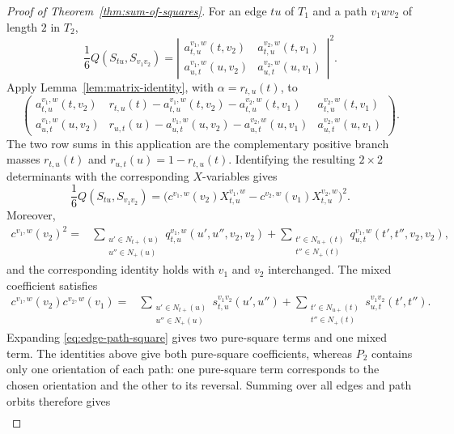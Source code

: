\documentclass[pdflatex,sn-mathphys-num]{sn-jnl}
\theoremstyle{thmstyleone}
\begin{document}
\begin{proof}[Proof of Theorem~\ref{thm:sum-of-squares}]
For an edge $tu$ of $T_1$ and a path $v_1wv_2$ of length $2$ in $T_2$,
\[
\frac16Q(S_{tu},S_{v_1v_2})=
\left|
\begin{matrix}
a_{t,u}^{v_1,w}(t,v_2)&a_{t,u}^{v_2,w}(t,v_1)\\
a_{u,t}^{v_1,w}(u,v_2)&a_{u,t}^{v_2,w}(u,v_1)
\end{matrix}
\right|^2.
\]
Apply Lemma~\ref{lem:matrix-identity}, with $\alpha=r_{t,u}(t)$, to
\begingroup
\small
\setlength{\arraycolsep}{12pt}
\renewcommand{\arraystretch}{1.12}
\[
\begin{pmatrix}
a_{t,u}^{v_1,w}(t,v_2)&
r_{t,u}(t)-a_{t,u}^{v_1,w}(t,v_2)-a_{t,u}^{v_2,w}(t,v_1)&
a_{t,u}^{v_2,w}(t,v_1)\\
a_{u,t}^{v_1,w}(u,v_2)&
r_{u,t}(u)-a_{u,t}^{v_1,w}(u,v_2)-a_{u,t}^{v_2,w}(u,v_1)&
a_{u,t}^{v_2,w}(u,v_1)
\end{pmatrix}.
\]
\endgroup
The two row sums in this application are the complementary positive branch
masses $r_{t,u}(t)$ and $r_{u,t}(u)=1-r_{t,u}(t)$.  Identifying the resulting
$2\times2$ determinants with the corresponding $X$-variables gives
\begin{equation}
\frac16Q(S_{tu},S_{v_1v_2})
=\bigl(c^{v_1,w}(v_2)X_{t,u}^{v_1,w}
-c^{v_2,w}(v_1)X_{t,u}^{v_2,w}\bigr)^2.          \label{eq:edge-path-square}
\end{equation}
Moreover,
\begin{align*}
c^{v_1,w}(v_2)^2
={}&\sum_{\substack{u'\in N_{t+}(u)\\u''\in N_+(u)}}
q_{t,u}^{v_1,w}(u',u'',v_2,v_2)
+\sum_{\substack{t'\in N_{u+}(t)\\t''\in N_+(t)}}
q_{u,t}^{v_1,w}(t',t'',v_2,v_2),
\end{align*}
and the corresponding identity holds with $v_1$ and $v_2$ interchanged.
The mixed coefficient satisfies
\begin{align*}
c^{v_1,w}(v_2)c^{v_2,w}(v_1)
={}&\sum_{\substack{u'\in N_{t+}(u)\\u''\in N_+(u)}}
s_{t,u}^{v_1v_2}(u',u'')
+\sum_{\substack{t'\in N_{u+}(t)\\t''\in N_+(t)}}
s_{u,t}^{v_1v_2}(t',t'').
\end{align*}
Expanding \eqref{eq:edge-path-square} gives two pure-square terms and one mixed
term.  The identities above give both pure-square coefficients, whereas $P_2$
contains only one orientation of each path: one pure-square term corresponds
to the chosen orientation and the other to its reversal.  Summing over all
edges and path orbits therefore gives
\begin{align}

\end{align}
\end{proof}
\end{document}
